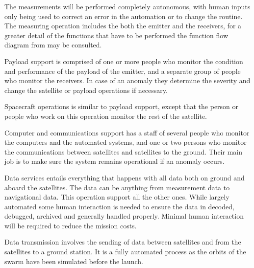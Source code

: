 The measurements will be performed completely autonomous, with human inputs only being used to correct an error in the automation or to change the routine. The measuring operation includes the both the emitter and the receivers, for a greater detail of the functions that have to be performed the function flow diagram from \cite{Baseline} may be consulted.

Payload support is comprised of one or more people who monitor the condition and performance of the payload of the emitter, and a separate group of people who monitor the receivers. In case of an anomaly they determine the severity and change the satellite or payload operations if necessary.

Spacecraft operations is similar to payload support, except that the person or people who work on this operation monitor the rest of the satellite.

Computer and communications support has a staff of several people who monitor the computers and the automated systems, and one or two persons who monitor the communications between satellites and satellites to the ground. Their main job is to make sure the system remains operational if an anomaly occurs.

Data services entails everything that happens with all data both on ground and aboard the satellites. The data can be anything from measurement data to navigational data. This operation support all the other ones. While largely automated some human interaction is needed to ensure the data in decoded, debugged, archived and generally handled properly. Minimal human interaction will be required to reduce the mission costs.

Data transmission involves the sending of data between satellites and from the satellites to a ground station. It is a fully automated process as the orbits of the swarm have been simulated before the launch.
